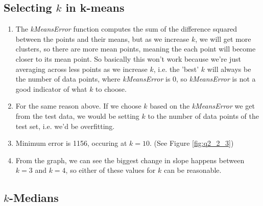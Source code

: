 \documentclass{article}
\def\enum#1{\begin{enumerate}#1\end{enumerate}}
\begin{document}
 \subsection{Selecting $k$ in k-means}
  
 \enum{
 \item The \emph{kMeansError} function computes the sum of the difference squared between the points and their means, but as we increase $k$, we will get more clusters, so there are more mean points, meaning the each point will become closer to its mean point. So basically this won't work because we're just averaging across less points as we increase $k$, i.e. the 'best' $k$ will always be the number of data points, where \emph{kMeansError} is 0, so \emph{kMeansError} is not a good indicator of what $k$ to choose.
 \item For the same reason above. If we choose $k$ based on the \emph{kMeansError} we get from the test data, we would be setting $k$ to the number of data points of the test set, i.e. we'd be overfitting.
 \item Minimum error is 1156, occuring at $k = 10$. (See Figure \ref{fig:q2_2_3})
 \item From the graph, we can see the biggest change in slope happens between $k=3$ and $k=4$, so either of these values for $k$ can be reasonable. 
 }
 
 \subsection{$k$-Medians}
 
\end{document}
